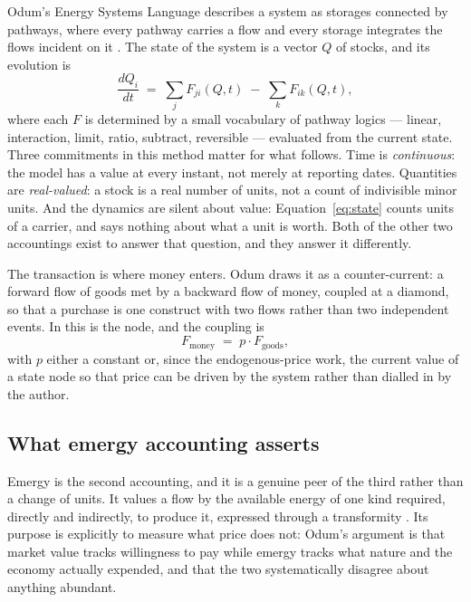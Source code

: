 \documentclass[11pt,a4paper]{article}
\begin{document}
Odum's Energy Systems Language describes a system as storages connected by pathways, where every pathway carries a flow and every storage integrates the flows incident on it \citep{odum1994,odum2000}. The state of the system is a vector $Q$ of stocks, and its evolution is
\begin{equation}
\frac{dQ_i}{dt} \;=\; \sum_{j} F_{ji}(Q,t) \;-\; \sum_{k} F_{ik}(Q,t),
\label{eq:state}
\end{equation}
where each $F$ is determined by a small vocabulary of pathway logics --- linear, interaction, limit, ratio, subtract, reversible --- evaluated from the current state. Three commitments in this method matter for what follows. Time is \emph{continuous}: the model has a value at every instant, not merely at reporting dates. Quantities are \emph{real-valued}: a stock is a real number of units, not a count of indivisible minor units. And the dynamics are silent about value: Equation~\eqref{eq:state} counts units of a carrier, and says nothing about what a unit is worth. Both of the other two accountings exist to answer that question, and they answer it differently.

The transaction is where money enters. Odum draws it as a counter-current: a forward flow of goods met by a backward flow of money, coupled at a diamond, so that a purchase is one construct with two flows rather than two independent events. In \gssk{} this is the  node, and the coupling is
\begin{equation}
F_{\text{money}} \;=\; p \cdot F_{\text{goods}},
\label{eq:coupling}
\end{equation}
with $p$ either a constant or, since the endogenous-price work, the current value of a state node so that price can be driven by the system rather than dialled in by the author.

\subsection{What emergy accounting asserts}
\label{sec:emergy}

Emergy is the second accounting, and it is a genuine peer of the third rather than a change of units. It values a flow by the available energy of one kind required, directly and indirectly, to produce it, expressed through a transformity \citep{odum1996,bastianoni2011}. Its purpose is explicitly to measure what price does not: Odum's argument is that market value tracks willingness to pay while emergy tracks what nature and the economy actually expended, and that the two systematically disagree about anything abundant.
\end{document}
